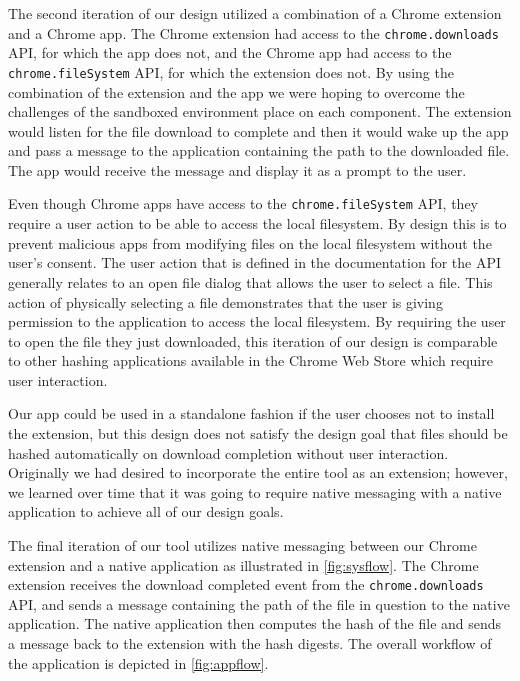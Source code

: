 \documentclass[letterpaper,twocolumn,10pt]{article}
\begin{document}
The second iteration of our design utilized a combination of a Chrome extension and a Chrome app.
The Chrome extension had access to the \texttt{chrome.downloads} API, for which the app does not,
and the Chrome app had access to the \texttt{chrome.fileSystem} API, for which the extension does not.
By using the combination of the extension and the app we were hoping to overcome the challenges of the
sandboxed environment place on each component. The extension would listen for the file download to
complete and then it would wake up the app and pass a message to the application containing the
path to the downloaded file. The app would receive the message and display it as a prompt to the user.

Even though Chrome apps have access to the \texttt{chrome.fileSystem} API, they require a user
action to be able to access the local filesystem. By design this is to prevent malicious apps from
modifying files on the local filesystem without the user’s consent. The user action that is defined
in the documentation for the API generally relates to an open file dialog that allows the user to select
a file. This action of physically selecting a file demonstrates that the user is giving permission to the
application to access the local filesystem. By requiring the user to open the file they just downloaded,
this iteration of our design is comparable to other hashing applications available in the Chrome
Web Store which require user interaction. 

Our app could be used in a standalone fashion if
the user chooses not to install the extension, but this design does not satisfy the design goal
that files should be hashed automatically on download completion without user interaction.
Originally we had desired to incorporate the entire tool as an extension; however, we learned
over time that it was going to require native messaging with a native application to achieve all
of our design goals.


The final iteration of our tool utilizes native messaging between our Chrome extension and a
native application as illustrated in \autoref{fig:sysflow}. The Chrome extension receives the download completed event from the
\texttt{chrome.downloads} API, and sends a message containing the path of the file in question
to the native application. The native application then computes the hash of the file and
sends a message back to the extension with the hash digests. The overall workflow of the application is depicted in \autoref{fig:appflow}.
\end{document}

